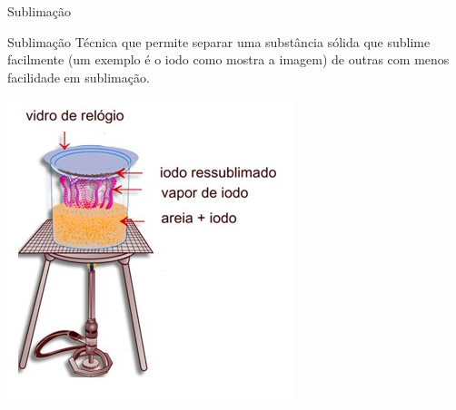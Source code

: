 \documentclass{beamer}
\begin{document}
\begin{frame}[label={sec:org64f129d}]{Sublimação}
\begin{block}{Sublimação}
Técnica que permite separar uma substância sólida que sublime facilmente (um exemplo é o iodo como mostra a imagem) de outras com menos facilidade em sublimação.

\begin{center}
\includegraphics[scale=0.5]{../img/sublimacao.png}
\end{center}
\end{block}
\end{frame}
\end{document}
